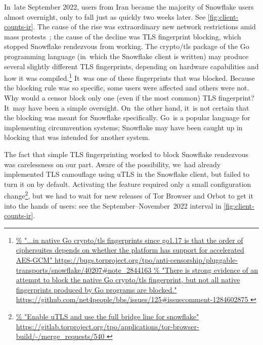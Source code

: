 \documentclass[letterpaper,twocolumn]{article}
\newlength{\urlfootnotesize}
\newcommand{\urlfootnote}[1]{\footnote{
\raggedright\fontsize{\urlfootnotesize}{\urlfootnotesize}\selectfont\url{#1}
}}
\begin{document}
In~late September 2022,
users from Iran became the majority of Snowflake users almost overnight,
only to fall just as quickly two weeks later.
See \autoref{fig:client-counts-ir}.
The cause of the rise was
extraordinary new network restrictions amid mass protests~\cite{ooni-2022-iran-blocks-social-media-mahsa-amini-protests};
the cause of the decline was TLS fingerprint blocking,
which stopped Snowflake rendezvous from working.
The crypto/tls package of the Go programming language
(in~which the Snowflake client is written)
may produce several slightly different TLS fingerprints,
depending on hardware capabilities and how it was compiled.\urlfootnote{
https://bugs.torproject.org/tpo/anti-censorship/pluggable-transports/snowflake/40207\#note_2844163
}
It~was one of these fingerprints that was blocked.
Because the blocking rule was so specific,
some users were affected and others were not.
Why would a censor block only one (even if the most common)
TLS fingerprint?
It~may have been a simple oversight.
On~the other hand, it~is not certain that the blocking
was meant for Snowflake specifically.
Go~is a popular language for implementing circumvention systems;
Snowflake may have been caught up in blocking that was intended for another system.

The fact that simple TLS fingerprinting worked to block Snowflake rendezvous
was carelessness on our part.
Aware of the possibility,
we~had already implemented TLS camouflage using uTLS
in the Snowflake client,
but failed to turn it on by default.
Activating the feature required only a small configuration change\urlfootnote{
https://gitlab.torproject.org/tpo/applications/tor-browser-build/-/merge_requests/540
},
but we had to wait for new releases of Tor Browser and Orbot
to get it into the hands of users:
see the September--November~2022 interval in \autoref{fig:client-counts-ir}.
\end{document}
